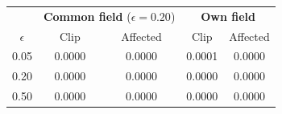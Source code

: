 \begin{tabular}{c c c c c}
  \toprule
  & \multicolumn{2}{c}{\textbf{Common field} ($\epsilon = 0.20$)} & \multicolumn{2}{c}{\textbf{Own field}} \\
  $\epsilon$ & Clip & Affected & Clip & Affected \\
  \midrule
    0.05 & 0.0000 & 0.0000 & 0.0001 & 0.0000 \\
    0.20 & 0.0000 & 0.0000 & 0.0000 & 0.0000 \\
    0.50 & 0.0000 & 0.0000 & 0.0000 & 0.0000 \\
  \bottomrule
\end{tabular}
